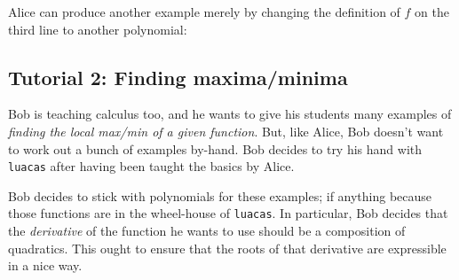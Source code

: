 \documentclass{article}
\begin{document}
Alice can produce another example merely by changing the definition of $f$ on the third line to another polynomial:

\subsection{Tutorial 2: Finding maxima/minima}

Bob is teaching calculus too, and he wants to give his students many examples of \emph{finding the local max/min of a given function}. But, like Alice, Bob doesn't want to work out a bunch of examples by-hand. Bob decides to try his hand with \texttt{luacas} after having been taught the basics by Alice. 

Bob decides to stick with polynomials for these examples; if anything because those functions are in the wheel-house of \texttt{luacas}. In particular, Bob decides that the \emph{derivative} of the function he wants to use should be a composition of quadratics. This ought to ensure that the roots of that derivative are expressible in a nice way. 
\end{document}

